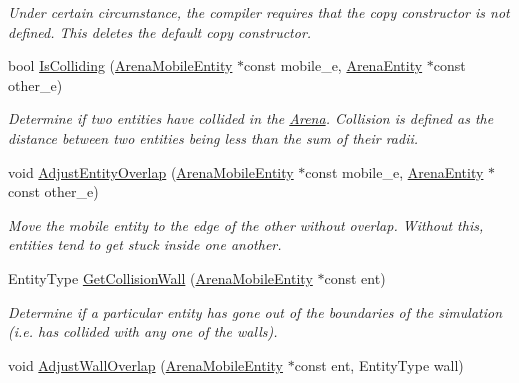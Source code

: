 \begin{DoxyCompactItemize}
\begin{DoxyCompactList}\small\item\em Under certain circumstance, the compiler requires that the copy constructor is not defined. This {\ttfamily deletes} the default copy constructor. \end{DoxyCompactList}\item 
bool \hyperlink{class_arena_ab4479b0268867602d0c4b510d5f99aff}{Is\+Colliding} (\hyperlink{class_arena_mobile_entity}{Arena\+Mobile\+Entity} $\ast$const mobile\+\_\+e, \hyperlink{class_arena_entity}{Arena\+Entity} $\ast$const other\+\_\+e)
\begin{DoxyCompactList}\small\item\em Determine if two entities have collided in the \hyperlink{class_arena}{Arena}. Collision is defined as the distance between two entities being less than the sum of their radii. \end{DoxyCompactList}\item 
void \hyperlink{class_arena_a2506fab770b6070d8f061bcab4c65138}{Adjust\+Entity\+Overlap} (\hyperlink{class_arena_mobile_entity}{Arena\+Mobile\+Entity} $\ast$const mobile\+\_\+e, \hyperlink{class_arena_entity}{Arena\+Entity} $\ast$const other\+\_\+e)\hypertarget{class_arena_a2506fab770b6070d8f061bcab4c65138}{}\label{class_arena_a2506fab770b6070d8f061bcab4c65138}

\begin{DoxyCompactList}\small\item\em Move the mobile entity to the edge of the other without overlap. Without this, entities tend to get stuck inside one another. \end{DoxyCompactList}\item 
Entity\+Type \hyperlink{class_arena_a7b72cf7688ee6ab1395bf438663bc1da}{Get\+Collision\+Wall} (\hyperlink{class_arena_mobile_entity}{Arena\+Mobile\+Entity} $\ast$const ent)
\begin{DoxyCompactList}\small\item\em Determine if a particular entity has gone out of the boundaries of the simulation (i.\+e. has collided with any one of the walls). \end{DoxyCompactList}\item 
void \hyperlink{class_arena_a51c1e99dfd9a618c6041fd22d0a11959}{Adjust\+Wall\+Overlap} (\hyperlink{class_arena_mobile_entity}{Arena\+Mobile\+Entity} $\ast$const ent, Entity\+Type wall)\hypertarget{class_arena_a51c1e99dfd9a618c6041fd22d0a11959}{}\label{class_arena_a51c1e99dfd9a618c6041fd22d0a11959}


\end{DoxyCompactItemize}
